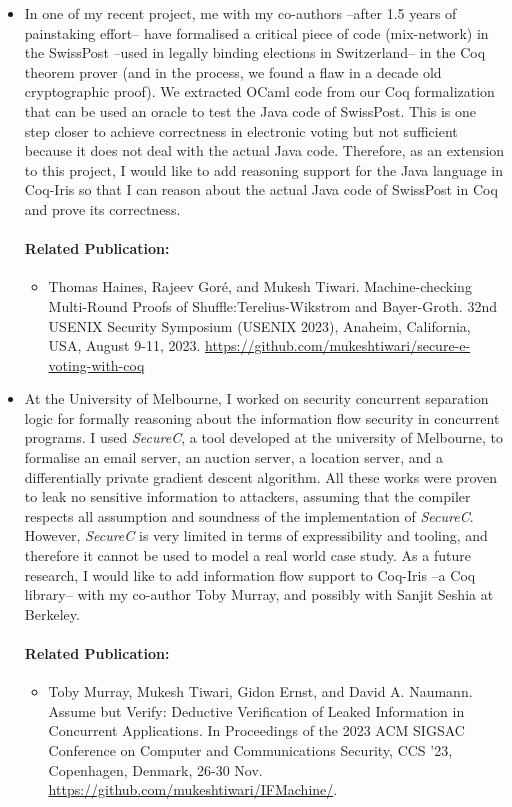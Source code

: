 \documentclass[a4paper]{article}
\begin{document}
\begin{itemize}
\item In one of my recent project, me with my co-authors --after 1.5 years of 
painstaking effort-- have formalised a critical 
piece of code (mix-network) in the SwissPost --used in legally binding elections 
in Switzerland-- in the Coq theorem prover (and in the process, we found a flaw in a decade 
old cryptographic proof). We extracted OCaml code from our Coq formalization that 
can be used an oracle to test the Java code of SwissPost. This is one step closer to 
achieve correctness in electronic voting but not sufficient because it does not 
deal with the actual Java code. Therefore, as an extension to this project, 
I would like to add reasoning support for the Java language in Coq-Iris so that I can 
reason about the actual Java code of SwissPost in Coq and prove 
its correctness.
\paragraph{Related Publication:} 
\begin{itemize}
    \item Thomas Haines, Rajeev Gor{\'e}, and Mukesh Tiwari.
    Machine-checking Multi-Round Proofs of Shuffle:Terelius-Wikstrom and Bayer-Groth. 
    32nd USENIX Security Symposium (USENIX 2023), Anaheim, California, USA, August 9-11, 2023.
    {\url{https://github.com/mukeshtiwari/secure-e-voting-with-coq}}

\end{itemize}


\item At the University of Melbourne, I worked on 
security concurrent separation logic for formally reasoning about the information 
flow security in concurrent programs. I used \textit{SecureC}, a tool developed at the university of 
Melbourne, to formalise an email server, an auction server, a location server, and 
a differentially private gradient descent algorithm. 
All these works were proven to leak no sensitive 
information to attackers, assuming that the compiler respects all 
assumption and soundness of the implementation of \textit{SecureC}. However, 
\textit{SecureC} is very limited in terms of expressibility and tooling, 
and therefore it cannot be used to model a real world case study. As a future research, 
I would like to add information flow support to Coq-Iris --a Coq library-- 
with my co-author Toby Murray, and possibly with Sanjit Seshia at Berkeley.


\paragraph{Related Publication:} 
\begin{itemize}
\item { Toby Murray, Mukesh Tiwari, Gidon Ernst, and David A. Naumann. 
Assume but Verify: Deductive Verification of Leaked Information in Concurrent Applications. 
In Proceedings of the 2023 ACM SIGSAC Conference on 
Computer and Communications Security, CCS '23, Copenhagen, Denmark, 26-30 Nov.}
{\url{https://github.com/mukeshtiwari/IFMachine/}}.
\end{itemize}



\end{itemize}
\end{document}

